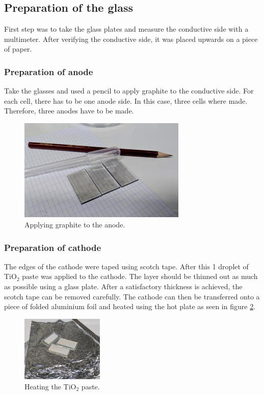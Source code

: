 \documentclass[conference]{IEEEtran}
\begin{document}
\subsection{Preparation of the glass}
First step was to take the glass plates and measure the conductive side with a multimeter. After verifying the conductive side, it was placed upwards on a piece of paper.

\subsubsection{Preparation of anode}
Take the glasses and used a pencil to apply graphite to the conductive side. For each cell, there has to be one anode side. In this case, three cells where made. Therefore, three anodes have to be made.

\begin{figure}[H]
\centering
\includegraphics[width=8.0cm]{img/4GraphiteLayer.jpg}
\caption{Applying graphite to the anode.}
\label{fig:graphitelayer} %
\end{figure}
\subsubsection{Preparation of cathode}
The edges of the cathode were taped using scotch tape. After this 1 droplet of TiO$_2$ paste was applied to the cathode. The layer should be thinned out as much as possible using a glass plate. After a satisfactory thickness is achieved, the scotch tape can be removed carefully. The cathode can then be transferred onto a piece of folded aluminium foil and heated using the hot plate as seen in figure \ref{fig:heatingti2o}.

\begin{figure}[H]
\centering
\includegraphics[width=0.35\textwidth]{img/2HeatedTiO.jpg}
\caption{Heating the TiO$_2$ paste.}
\label{fig:heatingti2o} %
\end{figure}
\end{document}
